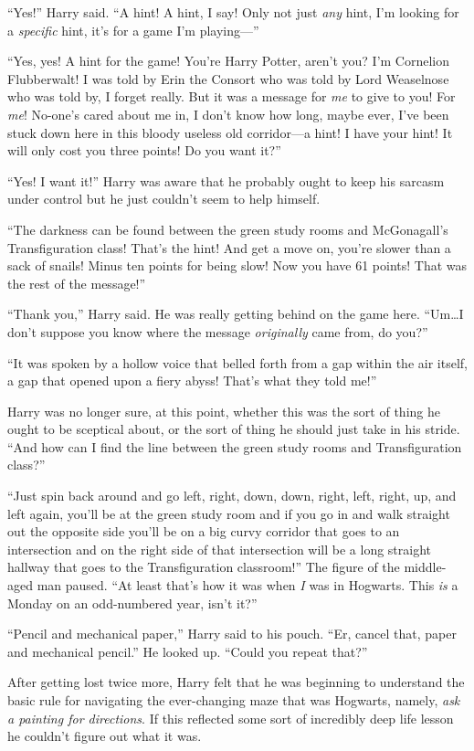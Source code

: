 “Yes!” Harry said. “A hint! A hint, I say! Only not just \emph{any} hint, I’m looking for a \emph{specific} hint, it’s for a game I’m playing—”

“Yes, yes! A hint for the game! You’re Harry Potter, aren’t you? I’m Cornelion Flubberwalt! I was told by Erin the Consort who was told by Lord Weaselnose who was told by, I forget really. But it was a message for \emph{me} to give to you! For \emph{me}! No-one’s cared about me in, I don’t know how long, maybe ever, I’ve been stuck down here in this bloody useless old corridor—a hint! I have your hint! It will only cost you three points! Do you want it?”

“Yes! I want it!” Harry was aware that he probably ought to keep his sarcasm under control but he just couldn’t seem to help himself.

“The darkness can be found between the green study rooms and McGonagall’s Transfiguration class! That’s the hint! And get a move on, you’re slower than a sack of snails! Minus ten points for being slow! Now you have 61 points! That was the rest of the message!”

“Thank you,” Harry said. He was really getting behind on the game here. “Um…I don’t suppose you know where the message \emph{originally} came from, do you?”

“It was spoken by a hollow voice that belled forth from a gap within the air itself, a gap that opened upon a fiery abyss! That’s what they told me!”

Harry was no longer sure, at this point, whether this was the sort of thing he ought to be sceptical about, or the sort of thing he should just take in his stride. “And how can I find the line between the green study rooms and Transfiguration class?”

“Just spin back around and go left, right, down, down, right, left, right, up, and left again, you’ll be at the green study room and if you go in and walk straight out the opposite side you’ll be on a big curvy corridor that goes to an intersection and on the right side of that intersection will be a long straight hallway that goes to the Transfiguration classroom!” The figure of the middle-aged man paused. “At least that’s how it was when \emph{I} was in Hogwarts. This \emph{is} a Monday on an odd-numbered year, isn’t it?”

“Pencil and mechanical paper,” Harry said to his pouch. “Er, cancel that, paper and mechanical pencil.” He looked up. “Could you repeat that?”

After getting lost twice more, Harry felt that he was beginning to understand the basic rule for navigating the ever-changing maze that was Hogwarts, namely, \emph{ask a painting for directions}. If this reflected some sort of incredibly deep life lesson he couldn’t figure out what it was.

